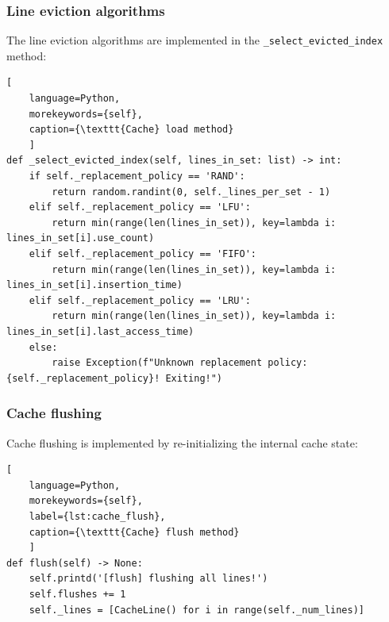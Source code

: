 \subsubsection*{Line eviction algorithms}
\noindent The line eviction algorithms are implemented in the \texttt{\_select\_evicted\_index} method:

\begin{center}
\centering
\begin{minipage}{\linewidth}
\begin{lstlisting}[
    language=Python,
	morekeywords={self},
    caption={\texttt{Cache} load method}
    ]
def _select_evicted_index(self, lines_in_set: list) -> int:
    if self._replacement_policy == 'RAND':
        return random.randint(0, self._lines_per_set - 1)
    elif self._replacement_policy == 'LFU':
        return min(range(len(lines_in_set)), key=lambda i: lines_in_set[i].use_count)
    elif self._replacement_policy == 'FIFO':
        return min(range(len(lines_in_set)), key=lambda i: lines_in_set[i].insertion_time)
    elif self._replacement_policy == 'LRU':
        return min(range(len(lines_in_set)), key=lambda i: lines_in_set[i].last_access_time)
    else:
        raise Exception(f"Unknown replacement policy: {self._replacement_policy}! Exiting!")
\end{lstlisting}
\end{minipage}
\end{center}


\subsubsection*{Cache flushing}
\noindent Cache flushing is implemented by re-initializing the internal cache state:

\begin{center}
\centering
\begin{minipage}{\linewidth}
\begin{lstlisting}[
    language=Python,
	morekeywords={self},
    label={lst:cache_flush},
    caption={\texttt{Cache} flush method}
    ]
def flush(self) -> None:
    self.printd('[flush] flushing all lines!')
    self.flushes += 1
    self._lines = [CacheLine() for i in range(self._num_lines)]
\end{lstlisting}
\end{minipage}
\end{center}


